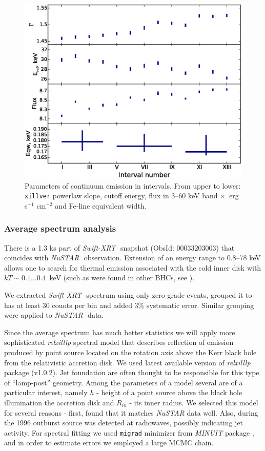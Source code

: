 \documentclass[a4paper,fleqn,usenatbib]{mnras}
\def\swiftx{{\em Swift-XRT\,}}
\def\nustar{{\em NuSTAR\,}}
\begin{document}
\begin{figure}
\centerline{\includegraphics[width=\linewidth]{intspe_v04.eps}}
\caption{Parameters of continuum emission in intervals. From upper to lower: \texttt{xillver} powerlaw slope, cutoff energy,  flux in 3--60 keV band $\times$\, erg s$^{-1}$ cm$^{-2}$ and Fe-line equivalent width.} 
\label{fig:intspe}
\end{figure}  
            
\subsubsection{Average spectrum analysis}
\label{sec:spec}            
There is a 1.3 ks part of \swiftx\, snapshot (ObsId: 00033203003) that coincides with \nustar\, observation. 
Extension of an energy range to 0.8--78 keV allows one to search for thermal emission associated with the cold inner disk with $kT \sim 0.1...0.4$~keV (such as were found in other BHCs, see \cite[][ e.t.c]{miller06b,miller06a,parker15}).

We extracted \swiftx\, spectrum using only zero-grade events, grouped it to has at least 30 counts per bin and added 3\% systematic error. 
Similar grouping were applied to \nustar\, data. 

Since the average spectrum has much better statistics we will apply more sophisticated {\it relxilllp} spectral model that describes reflection of emission produced by point source located on the rotation axis above the Kerr black hole from the relativistic accretion disk. 
We used latest available version of {\it relxilllp} package (v1.0.2).
Jet foundation are often thought to be responsible for this type of ``lamp-post'' geometry. 
Among the parameters of a model several are of a particular interest, namely $h$ - height of a point source above the black hole illumination the accretion disk and $R_{in}$ - its inner radius.  
We selected this model for several reasons - first, \cite{miller15_nust} found that it matches {\it NuSTAR} data well. 
Also, during the 1996 outburst source was detected at radiowaves, possibly indicating jet activity. 
For spectral fitting we used \texttt{migrad} minimizer from {\em MINUIT} package \citep{james75minuit}, and in order to estimate errors we employed a large MCMC chain. 
\end{document}
